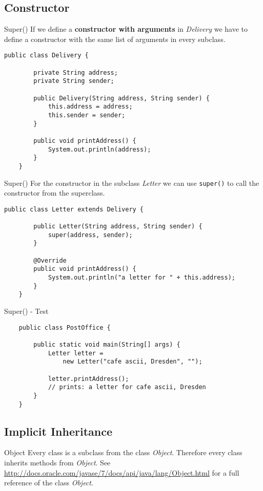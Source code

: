 \subsection{Constructor}
\begin{frame}[fragile]{Super()}
	If we define a \textbf{constructor with arguments} in \emph{Delivery} we have to define a constructor
	with the same list of arguments in every subclass.
	\begin{lstlisting}[basicstyle=\ttfamily\scriptsize]
	public class Delivery {
	
	    private String address;
	    private String sender;
	    
	    public Delivery(String address, String sender) {
	        this.address = address;
	        this.sender = sender;
	    }
	    	    
	    public void printAddress() {
	        System.out.println(address);
	    }
	}
	\end{lstlisting}
\end{frame}

\begin{frame}[fragile]{Super()}
	For the constructor in the subclass \emph{Letter} we can use \texttt{super()} to call the constructor
	from the superclass.
	\begin{lstlisting}[escapechar=!]
	public class Letter extends Delivery {

	    public Letter(String address, String sender) {
	        super(address, sender);
	    }
	
	    @Override
	    public void printAddress() {
	        System.out.println("a letter for " + this.address);    
	    }	
	}
	\end{lstlisting}
\end{frame}

\begin{frame}[fragile]{Super() - Test}
	\begin{lstlisting}
	public class PostOffice {
	    
	    public static void main(String[] args) {	    
	        Letter letter = 
	            new Letter("cafe ascii, Dresden", "");
	        
	        letter.printAddress();
	        // prints: a letter for cafe ascii, Dresden
	    }
	}
	\end{lstlisting}
\end{frame}

\subsection{Implicit Inheritance}
\begin{frame}{Object}
	Every class is a subclass from the class \emph{Object}. 
	Therefore every class inherits methods from \emph{Object}.
	\vfill
	See \scriptsize\url{http://docs.oracle.com/javase/7/docs/api/java/lang/Object.html} \normalsize for
	a full reference of the class \emph{Object}.
\end{frame}

